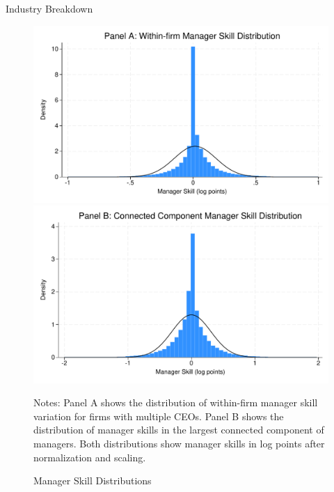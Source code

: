 \documentclass[11pt,a4paper]{article}
\begin{document}
\begin{table}[htbp]
\centering
\caption{Industry Breakdown}
\label{tab:industry_stats}

\end{table}

\begin{figure}[htbp]
\centering
\begin{minipage}{0.48\textwidth}
\centering
\includegraphics[width=\textwidth]{figure/manager_skill_within.pdf}
\end{minipage}
\hfill
\begin{minipage}{0.48\textwidth}
\centering
\includegraphics[width=\textwidth]{figure/manager_skill_connected.pdf}
\end{minipage}
\caption{Manager Skill Distributions}
\label{fig:manager_skills_appendix}
\footnotesize
Notes: Panel A shows the distribution of within-firm manager skill variation for firms with multiple CEOs. Panel B shows the distribution of manager skills in the largest connected component of managers. Both distributions show manager skills in log points after normalization and scaling.
\end{figure}
\end{document}
